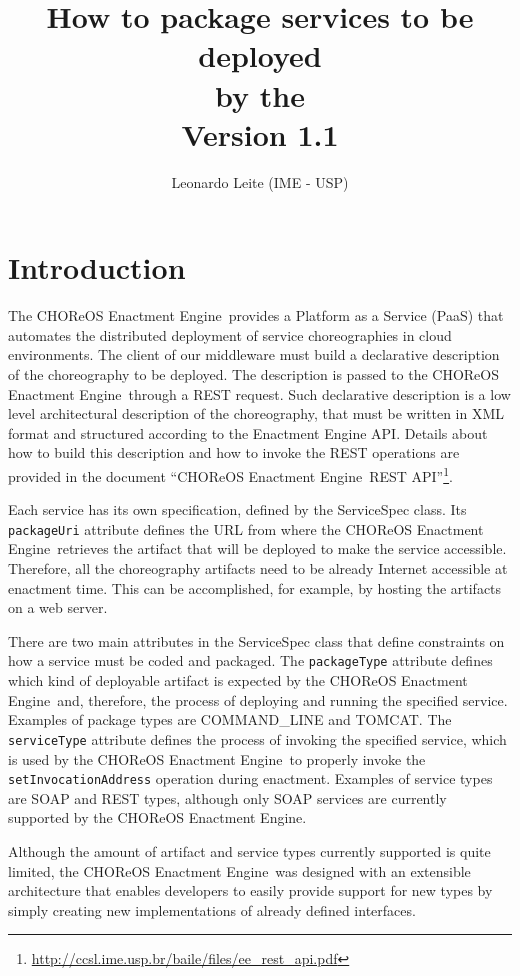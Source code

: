 \documentclass[a4paper, 10pt]{article}
\title{How to package services to be deployed \\ by the \ee \\ {\normalsize Version 1.1}}
\author{Leonardo Leite (IME - USP)}
\newcommand{\ee}{CHOReOS Enactment Engine}
\begin{document}
\maketitle

\section{Introduction}

The \ee\ provides a Platform as a Service (PaaS) that automates the distributed deployment of service choreographies in cloud environments. The client of our middleware must build a declarative description of the choreography to be deployed. The description is passed to the \ee\ through a REST request. Such declarative description is a low level architectural description of the choreography, that must be written in XML format and structured according to the Enactment Engine API. Details about how to build this description and how to invoke the REST operations are provided in the document ``\ee\ REST API''\footnote{\url{http://ccsl.ime.usp.br/baile/files/ee\_rest\_api.pdf}}. 

Each service has its own specification, defined by the \textsf{ServiceSpec} class. Its \texttt{packageUri} attribute defines the URL from where the \ee\ retrieves the artifact that will be deployed to make the service accessible. Therefore, all the choreography artifacts need to be already Internet accessible at enactment time. This can be accomplished, for example, by hosting the artifacts on a web server.

There are two main attributes in the \textsf{ServiceSpec} class that define constraints on how a service must be coded and packaged. The \texttt{packageType} attribute defines which kind of deployable artifact is expected by the \ee\ and, therefore, the process of deploying and running the specified service. Examples of package types are COMMAND\_LINE and TOMCAT. The \texttt{serviceType} attribute defines the process of invoking the specified service, which is used by the \ee\ to properly invoke the \texttt{setInvocationAddress} operation during enactment. Examples of service types are SOAP and REST types, although only SOAP services are currently supported by the \ee.

Although the amount of artifact and service types currently supported is quite limited, the \ee\ was designed with an extensible architecture that enables developers to easily provide support for new types by simply creating new implementations of already defined interfaces.
\end{document}
